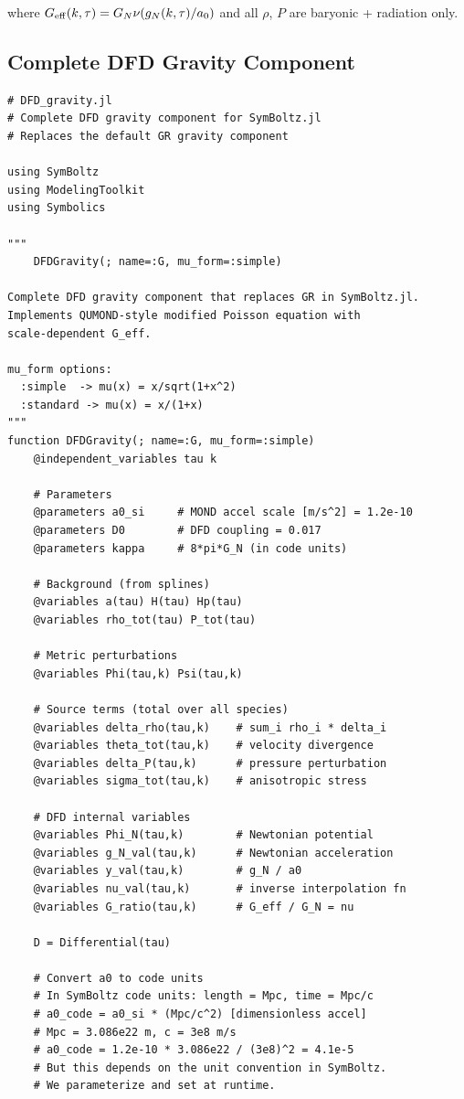 \documentclass[11pt,a4paper]{article}
\begin{document}
where $G_{\rm eff}(k,\tau) = G_N\nu(g_N(k,\tau)/a_0)$ and all $\rho$, $P$ are baryonic + radiation only.

\subsection{Complete DFD Gravity Component}

\begin{lstlisting}[caption={Complete DFD gravity replacing GR in SymBoltz.jl},label={lst:gravity}]
# DFD_gravity.jl
# Complete DFD gravity component for SymBoltz.jl
# Replaces the default GR gravity component

using SymBoltz
using ModelingToolkit
using Symbolics

"""
    DFDGravity(; name=:G, mu_form=:simple)

Complete DFD gravity component that replaces GR in SymBoltz.jl.
Implements QUMOND-style modified Poisson equation with
scale-dependent G_eff.

mu_form options:
  :simple  -> mu(x) = x/sqrt(1+x^2)
  :standard -> mu(x) = x/(1+x)
"""
function DFDGravity(; name=:G, mu_form=:simple)
    @independent_variables tau k

    # Parameters
    @parameters a0_si     # MOND accel scale [m/s^2] = 1.2e-10
    @parameters D0        # DFD coupling = 0.017
    @parameters kappa     # 8*pi*G_N (in code units)

    # Background (from splines)
    @variables a(tau) H(tau) Hp(tau)
    @variables rho_tot(tau) P_tot(tau)

    # Metric perturbations
    @variables Phi(tau,k) Psi(tau,k)

    # Source terms (total over all species)
    @variables delta_rho(tau,k)    # sum_i rho_i * delta_i
    @variables theta_tot(tau,k)    # velocity divergence
    @variables delta_P(tau,k)      # pressure perturbation
    @variables sigma_tot(tau,k)    # anisotropic stress

    # DFD internal variables
    @variables Phi_N(tau,k)        # Newtonian potential
    @variables g_N_val(tau,k)      # Newtonian acceleration
    @variables y_val(tau,k)        # g_N / a0
    @variables nu_val(tau,k)       # inverse interpolation fn
    @variables G_ratio(tau,k)      # G_eff / G_N = nu

    D = Differential(tau)

    # Convert a0 to code units
    # In SymBoltz code units: length = Mpc, time = Mpc/c
    # a0_code = a0_si * (Mpc/c^2) [dimensionless accel]
    # Mpc = 3.086e22 m, c = 3e8 m/s
    # a0_code = 1.2e-10 * 3.086e22 / (3e8)^2 = 4.1e-5
    # But this depends on the unit convention in SymBoltz.
    # We parameterize and set at runtime.


\end{lstlisting}
\end{document}
